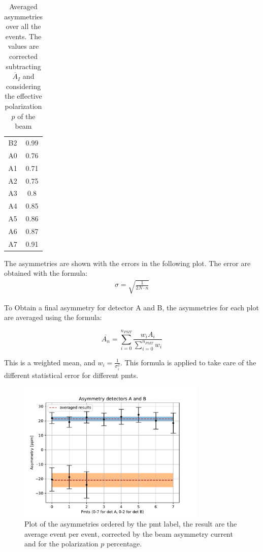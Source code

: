 \begin{table}[!ht]
{\begin{tabular}{c|c}
 B2    & 0.99 \\
 A0    & 0.76 \\
 A1    & 0.71 \\
 A2    & 0.75 \\
 A3    & 0.8  \\
 A4    & 0.85 \\
 A5    & 0.86 \\
 A6    & 0.87 \\
 A7    & 0.91 \\
\hline
\end{tabular}}
\caption{Averaged asymmetries over all the events. The values are corrected subtracting $\overline{A}_{I}$ and considering the effective polarization $p$ of the beam}
\end{table}

The asymmetries are shown with the errors in the following plot. The error are obtained with the formula:
\begin{align*}
\sigma = \sqrt{\frac{1}{2 N \cdot n}}
\end{align*}

To Obtain a final asymmetry for detector A and B, the asymmetries for each plot are averaged using the formula:

\begin{equation}
\overline{A_{n}} = \sum_{i = 0}^{n_{PMT}} \dfrac{ w_{i} A_{i}}{\sum_{i = 0}^{n_{PMT}} w_{i}}
\end{equation}

This is a weighted mean, and $w_{i} = \frac{1}{\sigma^{2}_{i}}$. This formula is applied to take care of the different statistical error for different pmts.

\begin{figure}[hbtp]
\centering
\includegraphics[width = 0.80\textwidth]{Analysis/Dataselection/FirstResult.pdf}
\caption{Plot of the asymmetries ordered by the pmt label, the result are the average event per event, corrected by the beam asymmetry current and for the polarization $p$ percentage.}
\end{figure}

